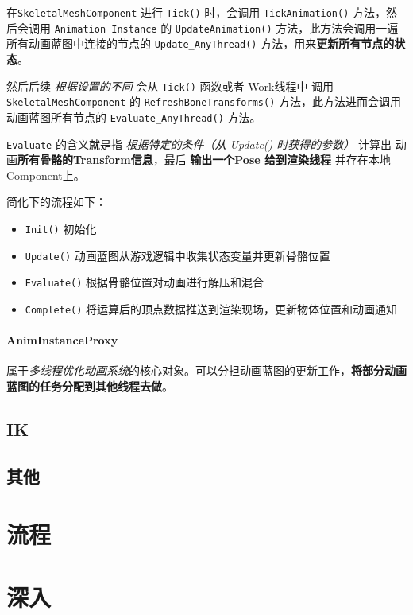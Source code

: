 \documentclass[UTF8,a4paper,12pt]{ctexbook}
\begin{document}
				在\verb|SkeletalMeshComponent| 进行 \verb|Tick()| 时，会调用 \verb|TickAnimation()| 方法，然后会调用 \verb|Animation Instance| 的 \verb|UpdateAnimation()| 方法，此方法会调用一遍所有动画蓝图中连接的节点的 \verb|Update_AnyThread()| 方法，用来\textbf{更新所有节点的状态}。
				
				然后后续 \textit{根据设置的不同} 会从 \verb|Tick()| 函数或者 Work线程中 调用 \verb|SkeletalMeshComponent| 的 \verb|RefreshBoneTransforms()| 方法，此方法进而会调用动画蓝图所有节点的 \verb|Evaluate_AnyThread()| 方法。
				
				\verb|Evaluate| 的含义就是指 \textit{根据特定的条件（从 Update() 时获得的参数）} 计算出 动画\textbf{所有骨骼的Transform信息}，最后 \textbf{输出一个Pose 给到渲染线程} 并存在本地Component上。
				
				简化下的流程如下：
				\begin{itemize}
					\item \verb|Init()| 初始化
					\item \verb|Update()| 动画蓝图从游戏逻辑中收集状态变量并更新骨骼位置
					\item \verb|Evaluate()| 根据骨骼位置对动画进行解压和混合
					\item \verb|Complete()| 将运算后的顶点数据推送到渲染现场，更新物体位置和动画通知
				\end{itemize}
				
				
			\paragraph{AnimInstanceProxy}
				属于\textit{多线程优化动画系统}的核心对象。可以分担动画蓝图的更新工作，\textbf{将部分动画蓝图的任务分配到其他线程去做}。
			
			
			
		\subsection{IK}
		
		
		\subsection{其他}
		
		
				
	\section{流程}
	
	
	\section{深入}
	
\end{document}
